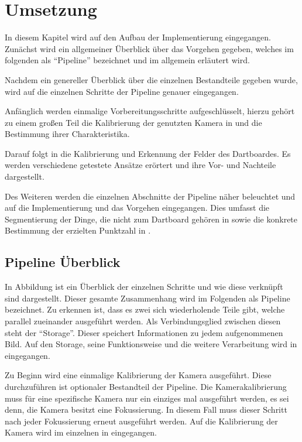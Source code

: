 
\chapter{Umsetzung}
\label{chap:coding}
In diesem Kapitel wird auf den Aufbau der Implementierung eingegangen. Zunächst wird ein allgemeiner Überblick über das Vorgehen gegeben, welches im folgenden als "`Pipeline"' bezeichnet und im  allgemein erläutert wird.

Nachdem ein genereller Überblick über die einzelnen Bestandteile gegeben wurde, wird auf die einzelnen Schritte der Pipeline genauer eingegangen.

Anfänglich werden einmalige Vorbereitungsschritte aufgeschlüsselt, hierzu gehört zu einem großen Teil die Kalibrierung der genutzten Kamera in  und die Bestimmung ihrer Charakteristika. 

Darauf folgt in  die Kalibrierung und Erkennung der Felder des Dartboardes. Es werden verschiedene getestete Ansätze erörtert und ihre Vor- und Nachteile dargestellt.

Des Weiteren werden die einzelnen Abschnitte der Pipeline näher beleuchtet und auf die Implementierung und das Vorgehen eingegangen.  Dies umfasst die Segmentierung der Dinge, die nicht zum Dartboard gehören in  sowie die konkrete
Bestimmung der erzielten Punktzahl in .
       
\section{Pipeline Überblick}
\label{sec:pipeline}
In Abbildung  ist ein Überblick der einzelnen Schritte und wie diese verknüpft sind dargestellt. Dieser gesamte Zusammenhang wird im Folgenden als Pipeline bezeichnet.
Zu erkennen ist, dass es zwei sich wiederholende Teile gibt, welche parallel zueinander ausgeführt werden.
 Als Verbindungsglied zwischen diesen steht der "`Storage"'. Dieser speichert Informationen zu jedem aufgenommenen Bild. Auf den Storage, seine Funktionsweise und die weitere Verarbeitung wird in  eingegangen. 

Zu Beginn wird eine einmalige Kalibrierung der Kamera ausgeführt. Diese durchzuführen ist optionaler Bestandteil der Pipeline. Die Kamerakalibrierung muss für eine spezifische Kamera nur ein einziges mal ausgeführt werden, es sei denn, die Kamera besitzt eine Fokussierung. In diesem Fall muss dieser Schritt nach jeder Fokussierung erneut ausgeführt werden. Auf die Kalibrierung der Kamera wird im einzelnen in  eingegangen.

